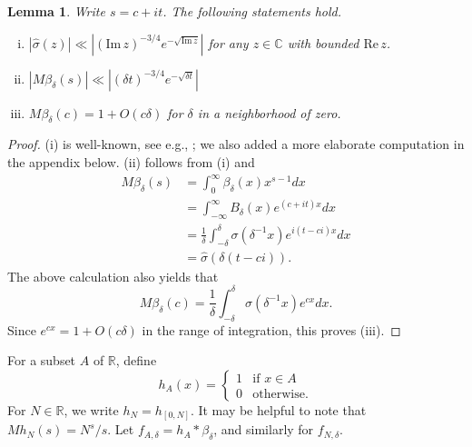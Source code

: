 \documentclass[11pt]{amsart}
\def\R{\mathbb{R}}
\newtheorem{lemma}[theorem]{Lemma}
\numberwithin{theorem}{section}
\numberwithin{equation}{section}
\theoremstyle{remark}
\theoremstyle{definition}
\newcommand{\C}{\mathbb{C}}
\newcommand{\re}{\mathrm{Re}\,}
\newcommand{\im}{\mathrm{Im}\,}
\newcommand{\ignore}[1]{{}}
\begin{document}
\begin{lemma}\label{lemma:sundry}
Write $s=c+it$. The following statements hold.
\begin{enumerate}[(i)]
\item $|\widehat\sigma(z)| \ll |(\im z)^{-3/4}e^{-\sqrt{\im z}}|$ for any $z \in \C$ with bounded $\re z$.
\item $|M\beta_\delta(s)| \ll |(\delta t)^{-3/4}e^{-\sqrt{\delta t}}|$
\item $M\beta_\delta(c) = 1+O(c\delta)$ for $\delta$ in a neighborhood of zero.
\end{enumerate}
\end{lemma}
\ignore{\color{red} The saddle point stuff is kind of a pain. Though it's possible to get around it --- we know $\hat\sigma(t)$ and $Mg(c+it)$, as a function of $t$ decrease faster than any polynomial, since they are Fourier transforms of bump functions; and that's enough for us actually --- it'd be nice to know what's going on more precisely.

I also may want to change $G(x) = \delta^{-1} \cdot \sigma(\delta^{-1}x)e^{-nx}$. This has the effect of making $Mg(n) = 1$.

Below I end up using $g$ for two things. Change it.
}
\begin{proof}
(i) is well-known, see e.g., \cite[Section 2]{Joh15}; we also added a more elaborate computation in the appendix below. (ii) follows from (i) and 
\begin{align*}
M\beta_\delta(s) &= \int_0^\infty \beta_\delta(x)x^{s-1}dx \\
&= \int_{-\infty}^\infty B_\delta(x)e^{(c+it)x}dx \\
&= \frac{1}{\delta}\int_{-\delta}^\delta \sigma(\delta^{-1}x)e^{i(t-ci)x}dx \\
&= \widehat\sigma(\delta(t-ci)).
\end{align*}
The above calculation also yields that
\begin{equation*}
M\beta_\delta(c) = \frac{1}{\delta}\int_{-\delta}^\delta \sigma(\delta^{-1}x)e^{cx}dx.
\end{equation*}
Since $e^{cx}= 1+O(c\delta)$ in the range of integration, this proves (iii).
\end{proof}

For a subset $A$ of $\R$, define
\begin{equation*}
h_A(x) = \begin{cases} 1 & \mbox{if $x \in A$} \\ 0 & \mbox{otherwise.}\end{cases}
\end{equation*}
For $N \in \R$, we write $h_N=h_{[0,N]}$. It may be helpful to note that $Mh_N(s) = N^s/s$. Let $f_{A,\delta}=h_A*\beta_\delta$, and similarly for $f_{N,\delta}$.
\end{document}
